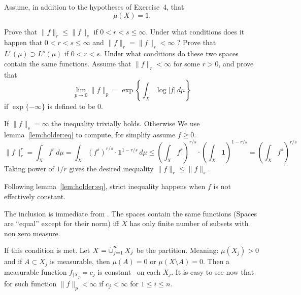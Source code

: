 \begin{enumerate}
\begin{itemize}
\end{itemize}

\begin{excopy}
Assume, in addition to the hypotheses of Exercise~4, that
\begin{equation*}
 \mu(X) = 1.
\end{equation*}
\begin{itemize}
 Prove that \(\|f\|_r \leq \|f\|_s\) if \(0<r<s\leq \infty\).
 Under what conditions does it happen that \(0<r<s\leq \infty\)
 and \(\|f\|_r = \|f\|_s < \infty\) ?
 Prove that
  \(L^r(\mu) \supset L^s(\mu)\) if \(0<r<s\).
 Under what conditions do these two spaces contain the same functions.
 Assume that \(\|f\|_r < \infty\) for some \(r>0\), and prove that
 \begin{equation*}
   \lim_{p\to 0} \|f\|_p = \exp\left\{\int_X \log|f|\,d\mu\right\}
 \end{equation*}
 if \(\exp\{-\infty\}\) is defined to be $0$.
\end{itemize}
\end{excopy}

\begin{itemize}
%
If \(\|f\|_s=\infty\) the inequality trivially holds. Otherwise
We use lemma~\ref{lem:holder:eq} to compute, for simplify assume \(f\geq 0\).
\begin{equation*}
\|f\|_r^r
 = \int_X f^r\,d\mu
 = \int_X (f^s)^{r/s}\cdot \mathbf{1}^{1-r/s}\,d\mu
 \leq \left(\int_X f^s\right)^{r/s} \cdot \left(\int_X \mathbf{1}\right)^{1-r/s}
 = \left(\int_X f^s\right)^{r/s}
\end{equation*}
Taking power of \(1/r\) gives the desired inequality \(\|f\|_r \leq \|f\|_s\).

 Following lemma~\ref{lem:holder:eq}, strict inequality happens
 when $f$ is not effectively constant.

The inclusion is immediate from . The spaces contain the same
functions (Spaces are ``equal'' except for their norm) iff $X$ has only finite
number of subsets with non zero measure.

If this condition is met. Let \(X=\disjunion_{j=1}^n X_j\) be the partition.
Meaning: \(\mu(X_j)>0\) and if \(A\subset X_j\) is measurable, then
\(\mu(A)=0\) or \(\mu(X\setminus A)=0\).
Then a measurable function \(f_{|X_j}=c_j\)
is constant \aded\ on each \(X_j\).
It is easy to see now that for such function \(\|f\|_p < \infty\)
if \(c_j<\infty\) for \(1\leq i \leq n\).


\end{itemize}
\end{enumerate}
